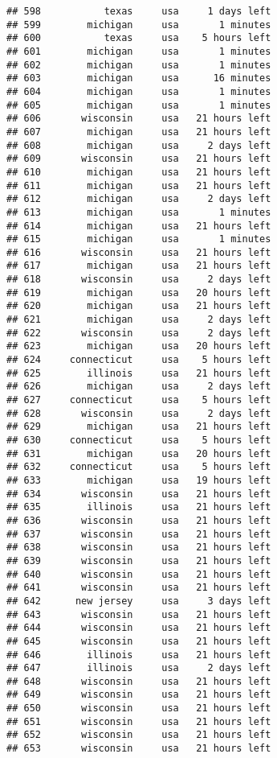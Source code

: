 \documentclass[
]{article}
\begin{document}
\begin{verbatim}
## 598           texas     usa     1 days left
## 599        michigan     usa       1 minutes
## 600           texas     usa    5 hours left
## 601        michigan     usa       1 minutes
## 602        michigan     usa       1 minutes
## 603        michigan     usa      16 minutes
## 604        michigan     usa       1 minutes
## 605        michigan     usa       1 minutes
## 606       wisconsin     usa   21 hours left
## 607        michigan     usa   21 hours left
## 608        michigan     usa     2 days left
## 609       wisconsin     usa   21 hours left
## 610        michigan     usa   21 hours left
## 611        michigan     usa   21 hours left
## 612        michigan     usa     2 days left
## 613        michigan     usa       1 minutes
## 614        michigan     usa   21 hours left
## 615        michigan     usa       1 minutes
## 616       wisconsin     usa   21 hours left
## 617        michigan     usa   21 hours left
## 618       wisconsin     usa     2 days left
## 619        michigan     usa   20 hours left
## 620        michigan     usa   21 hours left
## 621        michigan     usa     2 days left
## 622       wisconsin     usa     2 days left
## 623        michigan     usa   20 hours left
## 624     connecticut     usa    5 hours left
## 625        illinois     usa   21 hours left
## 626        michigan     usa     2 days left
## 627     connecticut     usa    5 hours left
## 628       wisconsin     usa     2 days left
## 629        michigan     usa   21 hours left
## 630     connecticut     usa    5 hours left
## 631        michigan     usa   20 hours left
## 632     connecticut     usa    5 hours left
## 633        michigan     usa   19 hours left
## 634       wisconsin     usa   21 hours left
## 635        illinois     usa   21 hours left
## 636       wisconsin     usa   21 hours left
## 637       wisconsin     usa   21 hours left
## 638       wisconsin     usa   21 hours left
## 639       wisconsin     usa   21 hours left
## 640       wisconsin     usa   21 hours left
## 641       wisconsin     usa   21 hours left
## 642      new jersey     usa     3 days left
## 643       wisconsin     usa   21 hours left
## 644       wisconsin     usa   21 hours left
## 645       wisconsin     usa   21 hours left
## 646        illinois     usa   21 hours left
## 647        illinois     usa     2 days left
## 648       wisconsin     usa   21 hours left
## 649       wisconsin     usa   21 hours left
## 650       wisconsin     usa   21 hours left
## 651       wisconsin     usa   21 hours left
## 652       wisconsin     usa   21 hours left
## 653       wisconsin     usa   21 hours left

\end{verbatim}
\end{document}
